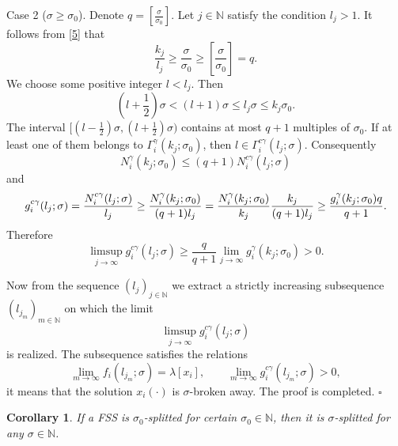 \documentclass[11pt]{article}
\newtheorem{corollary}[theorem]{Corollary}
\begin{document}
Case 2 ($\sigma \ge \sigma _{0}$).  Denote $q=\left[ \frac{\sigma }{\sigma _{0}}%
\right] $. Let $j\in \mathbb{N}$ satisfy the condition $l_{j}>1$. It follows
from \eqref{5} that%
\begin{equation*}
\frac{k_{j}}{l_{j}}\ge \frac{\sigma }{\sigma _{0}}\ge \left[ \frac{\sigma 
}{\sigma _{0}}\right] =q.
\end{equation*}%
We choose some positive integer $l<l_{j}$. Then%
\begin{equation*}
\left( l+\frac{1}{2}\right) \sigma <( l+1) \sigma \le
l_{j}\sigma \le k_{j}\sigma _{0}.
\end{equation*}%
The interval $[ ( l-\frac{1}{2}) \sigma ,( l+\frac{1}{2}%
) \sigma ) $ contains at most $q+1$ multiples of $\sigma _{0}$.
If at least one of them belongs to $\Gamma _{i}^{\gamma }( k_{j};\sigma
_{0}) $, then $l\in \Gamma _{i}^{c\gamma }( l_{j};\sigma ) $. 
Consequently%
\begin{equation*}
N_{i}^{\gamma }( k_{j};\sigma _{0}) \le ( q+1)
N_{i}^{c\gamma }( l_{j};\sigma )
\end{equation*}%
and%
\begin{equation*}
g_{i}^{c\gamma }( l_{j};\sigma ) =\frac{N_{i}^{c\gamma }(
l_{j};\sigma ) }{l_{j}}\ge \frac{N_{i}^{\gamma }( k_{j};\sigma
_{0}) }{( q+1) l_{j}} 
=\frac{N_{i}^{\gamma }( k_{j};\sigma _{0}) }{k_{j}}\frac{k_{j}}{%
( q+1) l_{j}}\ge \frac{g_{i}^{\gamma }( k_{j};\sigma
_{0}) q}{q+1}.
\end{equation*}%
Therefore%
\begin{equation*}
\limsup_{j\to\infty }g_{i}^{c\gamma }( l_{j};\sigma ) \ge \frac{q%
}{q+1}\lim_{j\to\infty }g_{i}^{\gamma }( k_{j};\sigma _{0}) >0.
\end{equation*}

Now from the sequence $( l_{j}) _{j\in \mathbb{N}}$ we extract a
strictly increasing subsequence $( l_{j_{m}}) _{m\in \mathbb{N}}$
on which the limit%
\begin{equation*}
\limsup_{j\to \infty }g_{i}^{c\gamma }( l_{j};\sigma )
\end{equation*}%
is realized. The subsequence satisfies the relations%
\begin{equation*}
\lim_{m\to \infty }f_{i}( l_{j_{m}};\sigma ) =\lambda 
[ x_{i}] ,
\qquad 
\lim_{m\to \infty }g_{i}^{c\gamma }( l_{j_{m}};\sigma )
>0,
\end{equation*}%
it means that the solution $x_{i}(\cdot)$ is $\sigma$-broken away. The proof
is completed.
\hfill $\square$

\begin{corollary}
\it
\label{Cor1}If a FSS is $\sigma_{0}$-splitted for certain $\sigma_{0}\in 
\mathbb{N}$, then it is $\sigma$-splitted for any $\sigma \in \mathbb{N}$.
\end{corollary}
\end{document}
